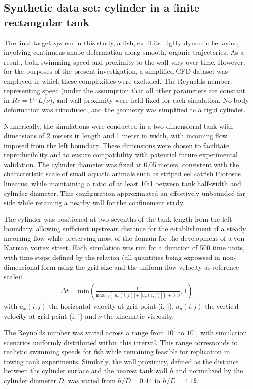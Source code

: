 \documentclass[preprint,12pt]{elsarticle}
\begin{document}
\subsection{Synthetic data set: cylinder in a finite rectangular tank}
\label{subsec3.1}
The final target system in this study, a fish, exhibits highly dynamic behavior, involving continuous shape deformation along smooth, organic trajectories. As a result, both swimming speed and proximity to the wall vary over time. However, for the purposes of the present investigation, a simplified CFD dataset was employed in which these complexities were excluded. The Reynolds number, representing speed (under the assumption that all other parameters are constant in $Re=U\cdot L/\nu$), and wall proximity were held fixed for each simulation. No body deformation was introduced, and the geometry was simplified to a rigid cylinder.

Numerically, the simulations were conducted in a two-dimensional tank with dimensions of 2 meters in length and 1 meter in width, with incoming flow imposed from the left boundary. These dimensions were chosen to facilitate reproducibility and to ensure compatibility with potential future experimental validation. The cylinder diameter was fixed at 0.05 meters, consistent with the characteristic scale of small aquatic animals such as striped eel catfish Plotosus lineatus, while maintaining a ratio of at least 10:1 between tank half-width and cylinder diameter. This configuration approximated an effectively unbounded far side while retaining a nearby wall for the confinement study.

The cylinder was positioned at two-sevenths of the tank length from the left boundary, allowing sufficient upstream distance for the establishment of a steady incoming flow while preserving most of the domain for the development of a von Karman vortex street. Each simulation was run for a duration of 500 time units, with time steps defined by the relation (all quantities being expressed in non-dimensional form using the grid size and the uniform flow velocity as reference scale):
\begin{align}
    \Delta t= \text{min}(\frac{1}{\text{max}_{i,j}(|u_x(i,j)|+|u_y(i,j)|) + 3\cdot\nu},1)
\end{align}
with $u_x(i,j)$ the horizontal velocity at grid point (i, j), $u_y(i,j)$ the vertical velocity at grid point (i, j) and $\nu$ the kinematic viscosity. 

The Reynolds number was varied across a range from $10^3$ to $10^4$, with simulation scenarios uniformly distributed within this interval. This range corresponds to realistic swimming speeds for fish while remaining feasible for replication in towing tank experiments. Similarly, the wall proximity, defined as the distance between the cylinder surface and the nearest tank wall $h$ and normalized by the cylinder diameter $D$, was varied from $h/D = 0.44$ to $h/D = 4.19$.
\end{document}
